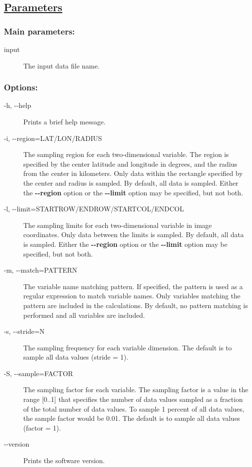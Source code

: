 \subsection*{\underline{Parameters}}
\subsubsection*{Main parameters:}
\begin{description}
\item[input]The input data file name. 

\end{description}
\subsubsection*{Options:}
\begin{description}
\item[ -h, -{-}help ] Prints a brief help message. 
\item[ -i, -{-}region=LAT/LON/RADIUS] The sampling region for each two-dimensional variable. The region is specified by the center latitude and longitude in degrees, and the radius from the center in kilometers. Only data within the rectangle specified by the center and radius is sampled. By default, all data is sampled. Either the \textbf{-{-}region}
 option or the \textbf{-{-}limit}
 option may be specified, but not both.
\item[ -l, -{-}limit=STARTROW/ENDROW/STARTCOL/ENDCOL] The sampling limits for each two-dimensional variable in image coordinates. Only data between the limits is sampled. By default, all data is sampled. Either the \textbf{-{-}region}
 option or the \textbf{-{-}limit}
 option may be specified, but not both.
\item[ -m, -{-}match=PATTERN ] The variable name matching pattern. If specified, the pattern is used as a regular expression to match variable names. Only variables matching the pattern are included in the calculations. By default, no pattern matching is performed and all variables are included. 
\item[ -s, -{-}stride=N ] The sampling frequency for each variable dimension. The default is to sample all data values (stride = 1). 
\item[ -S, -{-}sample=FACTOR ] The sampling factor for each variable. The sampling factor is a value in the range [0..1] that specifies the number of data values sampled as a fraction of the total number of data values. To sample 1 percent of all data values, the sample factor would be 0.01. The default is to sample all data values (factor = 1). 
\item[-{-}version]Prints the software version.

\end{description}
